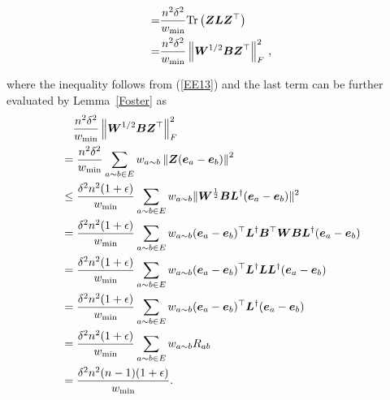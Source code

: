 \documentclass[journal]{IEEEtran}
\begin{document}
\begin{IEEEproof}
\begin{small}
\begin{align*}
            =   & \frac{n^2\delta^2}{w_{\min}}  \mathrm{Tr}\left(\boldsymbol{Z}\boldsymbol{L}\boldsymbol{Z}^{\top}\right)                                         \\
            =   & \frac{n^2\delta^{2}}{w_{\min}} \left\Vert\boldsymbol{W}^{1/2} \boldsymbol{B} \boldsymbol{Z}^{\top}\right\Vert_{F}^{2}\,,
        \end{align*}
    \end{small}
    where the  inequality follows from (\ref{EE13}) and the last term can be further evaluated by Lemma~\ref {Foster} as
    \begin{align*}
         & \quad \frac{n^2\delta^2}{w_{\min}} \left\Vert\boldsymbol{W}^{1/2} \boldsymbol{B} \boldsymbol{Z}^{\top}\right\Vert_{F}^{2}                                            \\
         & =\frac{n^2\delta^{2}}{w_{\min}}
        \sum_{a\sim b \in E} w_{a\sim b} \left\Vert\boldsymbol{Z} (\boldsymbol{e}_{a} - \boldsymbol{e}_{b})\right\Vert^{2}                                                      \\
         & \leq
        \frac{\delta^{2}n^2 (1+\epsilon)}{w_{\min}}
        \sum_{a\sim b \in E} w_{a\sim b}\|\boldsymbol{W}^{\frac{1}{2}} \boldsymbol{B} \boldsymbol{L}^{\dagger} (\boldsymbol{e}_a-\boldsymbol{e}_b)\|^2                              \\
         & =
        \frac{\delta^{2}n^2 (1+\epsilon)}{w_{\min}}
        \sum_{a\sim b \in E} w_{a\sim b}(\boldsymbol{e}_a-\boldsymbol{e}_b)^\top \boldsymbol{L}^{\dagger} \boldsymbol{B}^\top \boldsymbol{W} \boldsymbol{B} \boldsymbol{L}^{\dagger} (\boldsymbol{e}_a-\boldsymbol{e}_b) \\
         & =
        \frac{\delta^{2}n^2 (1+\epsilon)}{w_{\min}}
        \sum_{a\sim b \in E} w_{a\sim b}(\boldsymbol{e}_a-\boldsymbol{e}_b)^\top \boldsymbol{L}^{\dagger} \boldsymbol{L} \boldsymbol{L}^{\dagger} (\boldsymbol{e}_a-\boldsymbol{e}_b)                   \\
         & =
        \frac{\delta^{2}n^2 (1+\epsilon)}{w_{\min}}
        \sum_{a\sim b \in E} w_{a\sim b}(\boldsymbol{e}_a-\boldsymbol{e}_b)^\top \boldsymbol{L}^{\dagger} (\boldsymbol{e}_a-\boldsymbol{e}_b)                                       \\
         & =
        \frac{\delta^{2} n^2 (1+\epsilon)}{w_{\min}}
        \sum_{a\sim b \in E} w_{a\sim b} R_{ab}                                                                                       \\
         & =\frac{\delta^{2} n^2(n-1) (1+\epsilon)}{w_{\min}}.
    \end{align*}



\end{IEEEproof}
\end{document}
